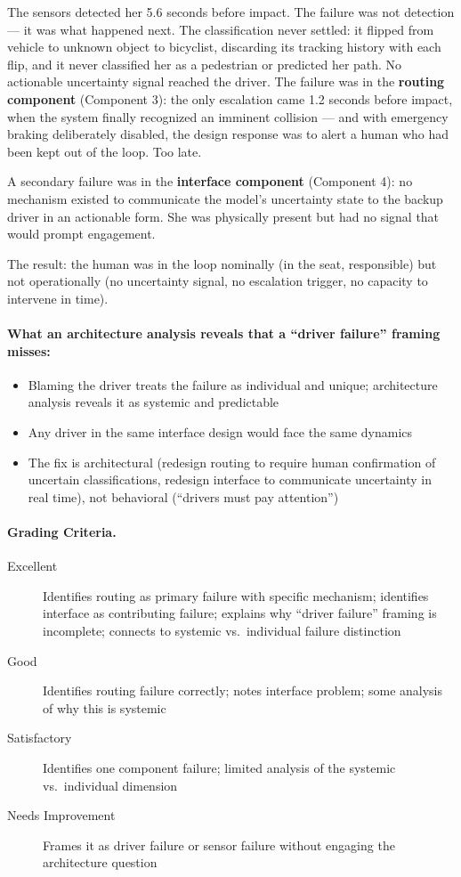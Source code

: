 The sensors detected her 5.6 seconds before impact. The failure was not detection --- it was what happened next. The classification never settled: it flipped from vehicle to unknown object to bicyclist, discarding its tracking history with each flip, and it never classified her as a pedestrian or predicted her path. No actionable uncertainty signal reached the driver. The failure was in the \textbf{routing component} (Component 3): the only escalation came 1.2 seconds before impact, when the system finally recognized an imminent collision --- and with emergency braking deliberately disabled, the design response was to alert a human who had been kept out of the loop. Too late.

A secondary failure was in the \textbf{interface component} (Component 4): no mechanism existed to communicate the model's uncertainty state to the backup driver in an actionable form. She was physically present but had no signal that would prompt engagement.

The result: the human was in the loop nominally (in the seat, responsible) but not operationally (no uncertainty signal, no escalation trigger, no capacity to intervene in time).

\paragraph{What an architecture analysis reveals that a ``driver failure'' framing misses:}
\begin{itemize}
    \item Blaming the driver treats the failure as individual and unique; architecture analysis reveals it as systemic and predictable
    \item Any driver in the same interface design would face the same dynamics
    \item The fix is architectural (redesign routing to require human confirmation of uncertain classifications, redesign interface to communicate uncertainty in real time), not behavioral (``drivers must pay attention'')
\end{itemize}

\paragraph{Grading Criteria.}
\begin{description}
    \item[Excellent] Identifies routing as primary failure with specific mechanism; identifies interface as contributing failure; explains why ``driver failure'' framing is incomplete; connects to systemic vs.\ individual failure distinction
    \item[Good] Identifies routing failure correctly; notes interface problem; some analysis of why this is systemic
    \item[Satisfactory] Identifies one component failure; limited analysis of the systemic vs.\ individual dimension
    \item[Needs Improvement] Frames it as driver failure or sensor failure without engaging the architecture question
\end{description}


